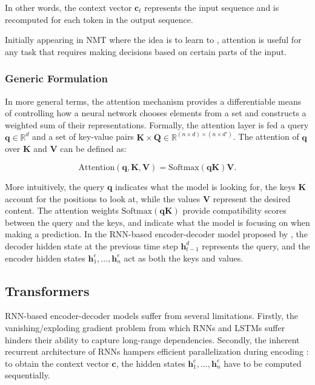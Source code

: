 In other words, the context vector $\bm{c}_t$ represents the input sequence and is recomputed for each token in the output sequence.

Initially appearing in \ac{NMT} where the idea is to learn to , attention is useful for any task that requires making decisions based on certain parts of the input. 

\subsubsection{Generic Formulation}

In more general terms, the attention mechanism provides a differentiable means of controlling how a neural network chooses elements from a set and constructs a weighted sum of their representations. Formally, the attention layer is fed a query $\bm{q} \in \mathbb{R}^d$ and a set of key-value pairs $\bm{K} \times \bm{Q} \in \mathbb{R}^{(n \times d) \times (n \times d')}$. The attention of $\bm{q}$ over $\bm{K}$ and $\bm{V}$ can be defined as:

\begin{equation}
    \mathrm{Attention}(\bm{q}, \bm{K}, \bm{V}) = \mathrm{Softmax}(\bm{q}\bm{K})\bm{V}.
\label{equation:attention-generic-formulation}
\end{equation}

More intuitively, the query $\bm{q}$ indicates what the model is looking for, the keys $\bm{K}$ account for the positions to look at, while the values $\bm{V}$ represent the desired content. The attention weights $\mathrm{Softmax}(\bm{q}\bm{K})$ provide compatibility scores between the query and the keys, and indicate what the model is focusing on when making a prediction. In the \ac{RNN}-based encoder-decoder model proposed by \citep{bahdanau2014neural}, the decoder hidden state at the previous time step $\bm{h}^d_{t-1}$ represents the query, and the encoder hidden states $\bm{h}^e_{1}, \ldots, \bm{h}^e_{n}$ act as both the keys and values. 

\subsection{Transformers}

\ac{RNN}-based encoder-decoder models suffer from several limitations. Firstly, the vanishing/exploding gradient problem from which \acp{RNN} and \acp{LSTM} suffer hinders their ability to capture long-range dependencies. Secondly, the inherent recurrent architecture of \acp{RNN} hampers efficient parallelization during encoding \citep{vaswani2017attention}: to obtain the context vector $\bm{c}$, the hidden states $\bm{h}^e_1, \ldots, \bm{h}^e_n$ have to be computed sequentially.


